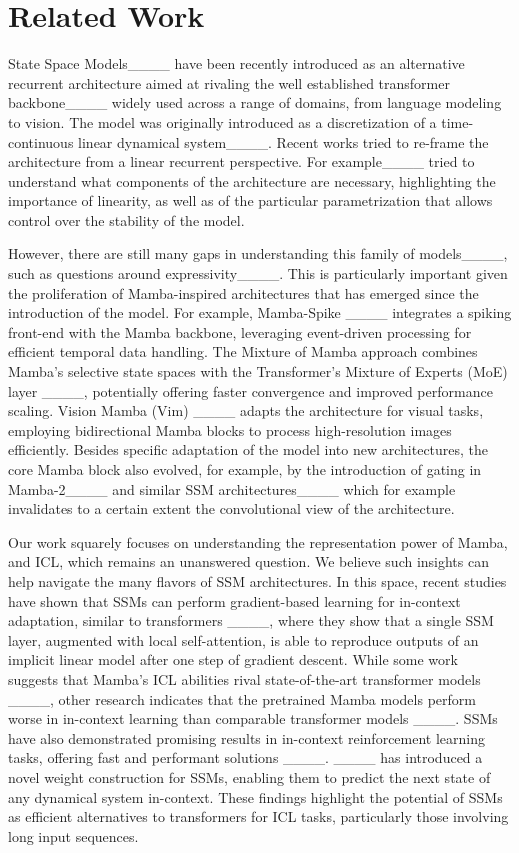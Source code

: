 \section{Related Work}
State Space Models____ have been recently introduced as an alternative recurrent architecture aimed at rivaling the well established transformer backbone____ widely used across a range of domains, from language modeling to vision. The model was originally introduced as a discretization of a time-continuous linear dynamical system____. Recent works tried to re-frame the architecture from a linear recurrent perspective. For example____ tried to understand what components of the architecture are necessary, highlighting the importance of linearity, as well as of the particular parametrization that allows control over the stability of the model.

However, there are still many gaps in understanding this family of models____, such as questions around expressivity____. This is particularly important given the proliferation of Mamba-inspired architectures that has emerged since the introduction of the model. 
For example, Mamba-Spike ____ integrates a spiking front-end with the Mamba backbone, leveraging event-driven processing for efficient temporal data handling. The Mixture of Mamba approach combines Mamba's selective state spaces with the Transformer's Mixture of Experts (MoE) layer ____, potentially offering faster convergence and improved performance scaling. Vision Mamba (Vim) ____ adapts the architecture for visual tasks, employing bidirectional Mamba blocks to process high-resolution images efficiently. Besides specific adaptation of the model into new architectures, the core Mamba block also evolved, for example, by the introduction of gating in Mamba-2____ and similar SSM architectures____ which for example invalidates to a certain extent the convolutional view of the architecture. 

Our work squarely focuses on understanding the representation power of Mamba, and ICL, which remains an unanswered question. We believe such insights can help navigate the many flavors of SSM architectures. In this space, recent studies have shown that SSMs can perform gradient-based learning for in-context adaptation, similar to transformers ____, where they show that a single SSM layer, augmented with local self-attention, is able to reproduce outputs of an implicit linear model after one step of gradient descent. While some work suggests that Mamba's ICL abilities rival state-of-the-art transformer models ____, other research indicates that the pretrained Mamba models perform worse in in-context learning than comparable transformer models ____. SSMs have also demonstrated promising results in in-context reinforcement learning tasks, offering fast and performant solutions ____. ____ has introduced a novel weight construction for SSMs, enabling them to predict the next state of any dynamical system in-context. These findings highlight the potential of SSMs as efficient alternatives to transformers for ICL tasks, particularly those involving long input sequences.